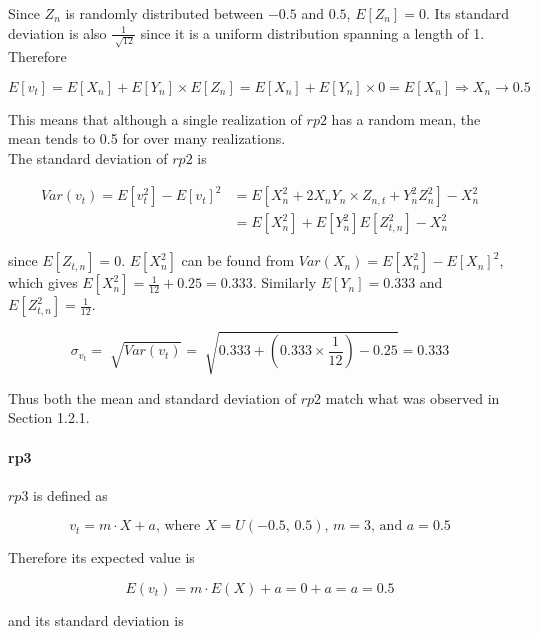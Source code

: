 Since $Z_n$ is randomly distributed between $-0.5$ and $0.5$, $E[Z_n]=0$. Its standard deviation is also $\frac{1}{\sqrt[]{12}}$ since it is a uniform distribution spanning a length of 1. Therefore

\begin{equation}
E[v_t]=E[X_n]+E[Y_n] \times E[Z_n] =E[X_n]+E[Y_n] \times 0=E[X_n] \Rightarrow X_n \rightarrow 0.5
\end{equation}

This means that although a single realization of $rp2$ has a random mean, the mean tends to 0.5 for over many realizations.\\

The standard deviation of $rp2$ is

\begin{align}
Var(v_t) = E[v_t^2]-E[v_t]^2 &=E[X_n^2 + 2X_n Y_n \times Z_{n,t} + Y_n^2Z_n^2]-X_n^2\\
&= E[X_n^2]+E[Y_n^2]E[Z_{t,n}^2]-X_n^2
\end{align}

since $E[Z_{t,n}]=0$. $E[X_n^2]$ can be found from $Var(X_n)=E[X_n^2]-E[X_n]^2$, which gives $E[X_n^2]=\frac{1}{12} + 0.25 = 0.333$. Similarly $E[Y_n]=0.333$ and $E[Z_{t,n}^2]=\frac{1}{12}$.

\begin{equation}
\sigma_{v_t}=\sqrt[]{Var(v_t)}=\sqrt[]{0.333 + (0.333 \times \frac{1}{12}) - 0.25}=0.333
\end{equation}

Thus both the mean and standard deviation of $rp2$ match what was observed in Section 1.2.1.


\paragraph{rp3}

$rp3$ is defined as

\begin{equation}
v_t=m\cdot X +a \text{, where } X=U(-0.5\text{, }0.5)\text{, }m=3\text{, and }a=0.5
\end{equation}

Therefore its expected value is

\begin{equation}
E(v_t)=m \cdot E(X)+a=0+a=a=0.5
\end{equation}

and its standard deviation is

